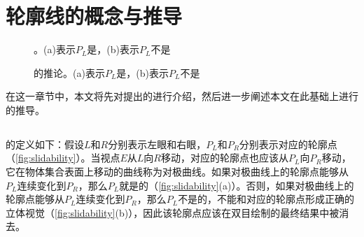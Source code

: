 \chapter{\stc{}轮廓线的概念与推导}

\begin{figure}[tbh]
    \centering
    \hfil
    \caption{\epsl{}。(a)表示$P_L$是\epslb{}，(b)表示$P_L$不是\epslb{}} \label{fig_sim2}
    \label{fig:slidability}
\end{figure}

\begin{figure}[tbh]
    \centering
    \hfil
    \caption{\epsl{}的推论。(a)表示$P_L$是\epslb{}，(b)表示$P_L$不是\epslb{}} \label{fig:inverse_slidability}
\end{figure}

在这一章节中，本文将先对\citeauthor{kim2013stereoscopic}提出的\epsl{}\cite{kim2013stereoscopic}进行介绍，然后进一步阐述本文在此基础上进行的推导。

\section{\epsl{}}

\epsl{}的定义如下：假设$L$和$R$分别表示左眼和右眼，$P_L$和$P_R$分别表示对应的轮廓点（\autoref{fig:slidability}）。当视点$E$从$L$向$R$移动，对应的轮廓点也应该从$P_L$向$P_R$移动，它在物体集合表面上移动的曲线称为对极曲线\cite{geiger1995occlusions}。如果对极曲线上的轮廓点能够从$P_L$连续变化到$P_R$，那么$P_L$就是\epslb{}的（\autoref{fig:slidability}(a)）。否则，如果对极曲线上的轮廓点能够从$P_L$连续变化到$P_R$，那么$P_L$不是\epslb{}的，不能和对应的轮廓点形成正确的立体视觉（\autoref{fig:slidability}(b)），因此该轮廓点应该在双目绘制的最终结果中被消去。
 
